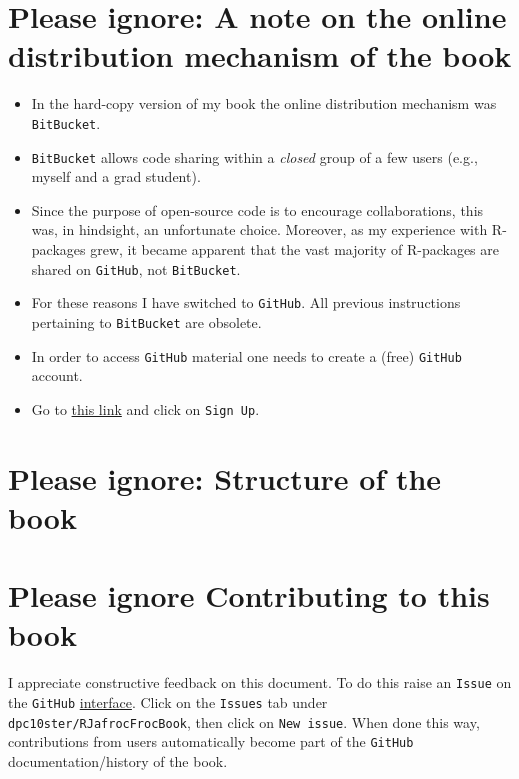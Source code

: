 \documentclass[
]{book}
\providecommand{\tightlist}{%
  \setlength{\itemsep}{0pt}\setlength{\parskip}{0pt}}
\begin{document}
\hypertarget{please-ignore-a-note-on-the-online-distribution-mechanism-of-the-book}{%
\section{Please ignore: A note on the online distribution mechanism of the book}\label{please-ignore-a-note-on-the-online-distribution-mechanism-of-the-book}}

\begin{itemize}
\tightlist
\item
  In the hard-copy version of my book \citep{chakraborty2017observer} the online distribution mechanism was \texttt{BitBucket}.
\item
  \texttt{BitBucket} allows code sharing within a \emph{closed} group of a few users (e.g., myself and a grad student).
\item
  Since the purpose of open-source code is to encourage collaborations, this was, in hindsight, an unfortunate choice. Moreover, as my experience with R-packages grew, it became apparent that the vast majority of R-packages are shared on \texttt{GitHub}, not \texttt{BitBucket}.
\item
  For these reasons I have switched to \texttt{GitHub}. All previous instructions pertaining to \texttt{BitBucket} are obsolete.
\item
  In order to access \texttt{GitHub} material one needs to create a (free) \texttt{GitHub} account.
\item
  Go to \href{https://github.com}{this link} and click on \texttt{Sign\ Up}.
\end{itemize}

\hypertarget{please-ignore-structure-of-the-book}{%
\section{Please ignore: Structure of the book}\label{please-ignore-structure-of-the-book}}

\hypertarget{please-ignore-contributing-to-this-book}{%
\section{Please ignore Contributing to this book}\label{please-ignore-contributing-to-this-book}}

I appreciate constructive feedback on this document. To do this raise an \texttt{Issue} on the \texttt{GitHub} \href{https://github.com/dpc10ster/RJafrocFrocBook}{interface}. Click on the \texttt{Issues} tab under \texttt{dpc10ster/RJafrocFrocBook}, then click on \texttt{New\ issue}. When done this way, contributions from users automatically become part of the \texttt{GitHub} documentation/history of the book.
\end{document}
